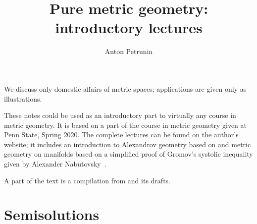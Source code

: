 \documentclass[twoside]{book}
\begin{document}
 
\title{Pure metric geometry:\\
introductory lectures}
\author{Anton Petrunin}
\date{}
\maketitle

We discuss only domestic affairs of metric spaces;
applications are given only as illustrations.

These notes could be used as an introductory part to virtually any course in metric geometry.
It is based on a part of the course in metric geometry given at Penn State, Spring 2020.
The complete lectures can be found on the author's website;
it includes an introduction to Alexandrov geometry based on \cite{alexander-kapovitch-petrunin-2019} and metric geometry on manifolds \cite{petrunin2020} based on a simplified proof of Gromov's systolic inequality given by Alexander Nabutovsky~\cite{nabutovsky}.

A part of the text is a compilation from \cite{alexander-kapovitch-petrunin-2019, alexander-kapovitch-petrunin-2025, petrunin-yashinski, petrunin-2009, petrunin-zamorabarrera} and its drafts.

\thispagestyle{empty}
\tableofcontents
\thispagestyle{empty}






%

\appendix
\chapter{Semisolutions}






{\small\sloppy


\printbibliography[heading=bibintoc]
\fussy
}
\end{document}
